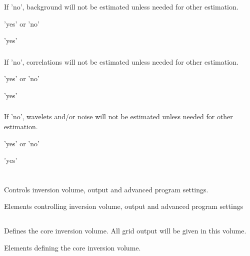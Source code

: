 \subsubsection{}  
 \slist
   \item \Description If 'no', background will not be estimated unless needed for other estimation.
   \item \Argument 'yes' or 'no'
   \item \Default 'yes'
 \elist

\subsubsection{}  
 \slist
   \item \Description If 'no', correlations will not be estimated unless needed for other estimation.
   \item \Argument 'yes' or 'no'
   \item \Default 'yes'
 \elist

\subsubsection{}  
 \slist
   \item \Description If 'no', wavelets and/or noise will not be estimated unless needed for other estimation.
   \item \Argument 'yes' or 'no'
   \item \Default 'yes'
 \elist

 \section{\necessary} 
 \slist
   \item \Description Controls inversion volume, output and advanced program settings.
   \item \Argument Elements controlling inversion volume, output and advanced program settings
   \item \Default
 \elist

\subsection{\necessary} 
 \slist
   \item \Description Defines the core inversion volume. All grid output will be given in this volume.
   \item \Argument Elements defining the core inversion volume.
   \item \Default
 \elist

